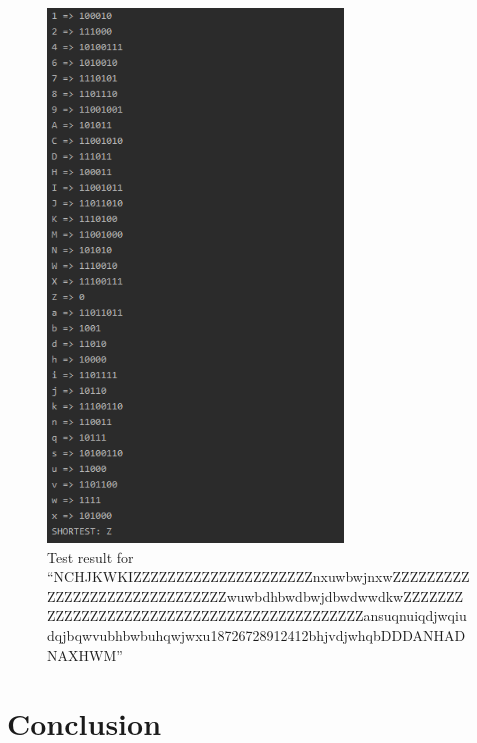 \documentclass{article}
\newcommand{\quotes}[1]{``#1''}
\begin{document}
									\begin{figure}[H]
					\centering
			 			\includegraphics[width=0.7\textwidth]{hctest3.png}
			 			\centering
			  			\caption{Test result for \quotes{NCHJKWKIZZZZZZZZZZZZZZZZZZZZZnxuwbwjnxwZZZZZZZZZZZZZZZZZZZZZZZZZZZZZZwuwbdhbwdbwjdbwdwwdkwZZZZZZZZZZZZZZZZZZZZZZZZZZZZZZZZZZZZZZZZZZZZansuqnuiqdjwqiudqjbqwvubhbwbuhqwjwxu18726728912412bhjvdjwhqbDDDANHADNAXHWM}}
			  			\label{fig:hctest3}
					\end{figure}
					
					
		\section{Conclusion}
		
\end{document}
